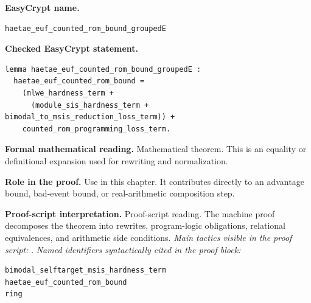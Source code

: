 \begin{formaltheorem}
\noindent\textbf{EasyCrypt name.}
\begin{lstlisting}[language=EasyCrypt,basicstyle=\ttfamily\scriptsize]
haetae_euf_counted_rom_bound_groupedE
\end{lstlisting}
\noindent\textbf{Checked EasyCrypt statement.}
\begin{lstlisting}[language=EasyCrypt,basicstyle=\ttfamily\scriptsize]
lemma haetae_euf_counted_rom_bound_groupedE :
  haetae_euf_counted_rom_bound =
    (mlwe_hardness_term +
      (module_sis_hardness_term + bimodal_to_msis_reduction_loss_term)) +
    counted_rom_programming_loss_term.
\end{lstlisting}
\noindent\textbf{Formal mathematical reading.}
Mathematical theorem. This is an equality or definitional expansion used for rewriting and normalization.

\noindent\textbf{Role in the proof.}
Use in this chapter. It contributes directly to an advantage bound, bad-event bound, or real-arithmetic composition step.

\noindent\textbf{Proof-script interpretation.}
Proof-script reading. The machine proof decomposes the theorem into rewrites, program-logic obligations, relational equivalences, and arithmetic side conditions.
\emph{Main tactics visible in the proof script:} .
\emph{Named identifiers syntactically cited in the proof block:}
\begin{lstlisting}[language=EasyCrypt,basicstyle=\ttfamily\scriptsize]
bimodal_selftarget_msis_hardness_term
haetae_euf_counted_rom_bound
ring
\end{lstlisting}

\end{formaltheorem}

